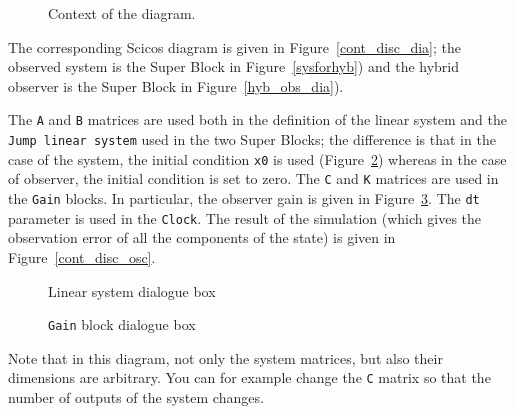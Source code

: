 \documentclass{book}
\begin{document}
 \begin{figure}[ht]
 \centerline{}
 \caption{Context of the diagram.}
\label{context_hyb}
 \end{figure}

The corresponding Scicos diagram is given in
Figure~\ref{cont_disc_dia};  the observed system is the Super Block in
Figure~\ref{sysforhyb}) and the hybrid observer  is the Super Block in
Figure~\ref{hyb_obs_dia}).  







The {\tt A}
and {\tt B} matrices are used both in the definition of the linear system 
and the {\tt Jump linear system} used in the two Super Blocks; the
difference is that in the case of 
the system, the initial condition {\tt x0} is used
(Figure~\ref{sysforhybdlg}) whereas in the case
of observer, the initial condition is set to zero. 
The {\tt C} and {\tt K} matrices are used 
in the {\tt Gain} blocks. In particular, the observer gain
is given in Figure~\ref{hybobsdlgdlg}. The {\tt dt} parameter is used
in the {\tt Clock}. The result of the simulation (which gives the
observation error of all the components of the state) is given in
Figure~\ref{cont_disc_osc}. 

%
  \begin{figure}[htbp]
  \centerline{}
  \caption{Linear system dialogue box}
 \label{sysforhybdlg}
  \end{figure}

  \begin{figure}[htbp]
  \centerline{}
  \caption{{\tt Gain} block dialogue box}
 \label{hybobsdlgdlg}
  \end{figure}





Note that in this diagram, not only the system matrices, but also
their dimensions are arbitrary. You can for example change the {\tt C}
matrix so that the number of outputs of the system changes. 
\end{document}
